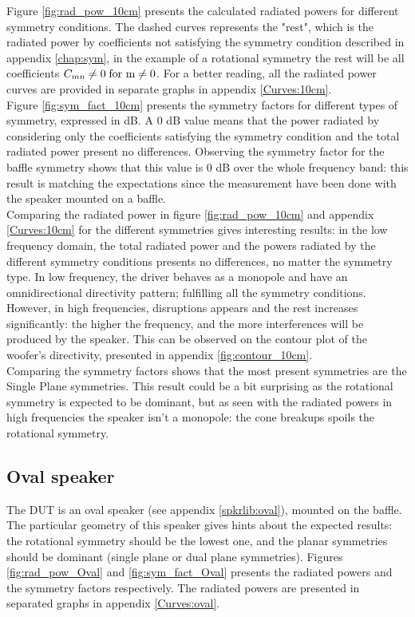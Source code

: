 \documentclass{report}
\begin{document}
Figure \ref{fig:rad_pow_10cm} presents the calculated radiated powers for different symmetry conditions. The dashed curves represents the "rest", which is the radiated power by coefficients not satisfying the symmetry condition described in appendix \ref{chap:sym}, in the example of a rotational symmetry the rest will be all coefficients $C_{mn} \neq 0 \;  \textup{for m}  \neq 0$. For a better reading, all the radiated power curves are provided in separate graphs in appendix \ref{Curves:10cm}.\\

Figure \ref{fig:sym_fact_10cm} presents the symmetry factors for different types of symmetry, expressed in dB. A 0 dB value means that the power radiated by considering only the coefficients satisfying the symmetry condition and the total radiated power present no differences. Observing the symmetry factor for the baffle symmetry shows that this value is 0 dB over the whole frequency band: this result is matching the expectations since the measurement have been done with the speaker mounted on a baffle. \\

Comparing the radiated power in figure \ref{fig:rad_pow_10cm} and appendix \ref{Curves:10cm} for the different symmetries gives interesting results: in the low frequency domain, the total radiated power and the powers radiated by the different symmetry conditions presents no differences, no matter the symmetry type. In low frequency, the driver behaves as a monopole and have an omnidirectional directivity pattern; fulfilling all the symmetry conditions. \\
However, in high frequencies, disruptions appears and the rest increases significantly: the higher the frequency, and the more interferences will be produced by the speaker. This can be observed on the contour plot of the woofer's directivity, presented in appendix \ref{fig:contour_10cm}. \\

Comparing the symmetry factors shows that the most present symmetries are the Single Plane symmetries. This result could be a bit surprising as the rotational symmetry is expected to be dominant, but as seen with the radiated powers in high frequencies the speaker isn't a monopole: the cone breakups spoils the rotational symmetry. 

\subsection{Oval speaker}
The DUT is an oval speaker (see appendix \ref{spkrlib:oval}), mounted on the baffle. The particular geometry of this speaker gives hints about the expected results: the rotational symmetry should be the lowest one, and the planar symmetries should be dominant (single plane or dual plane symmetries).  Figures \ref{fig:rad_pow_Oval} and \ref{fig:sym_fact_Oval} presents the radiated powers and the symmetry factors respectively. The radiated powers are presented in separated graphs in appendix \ref{Curves:oval}.\\
\end{document}

